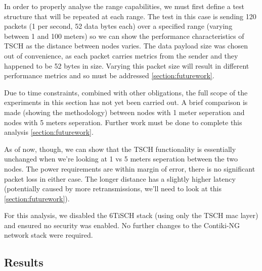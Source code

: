 \documentclass[conference]{IEEEtran}
\begin{document}
In order to properly analyse the range capabilities, we must first define a test structure that will be repeated at each range. The test in this case is sending 120 packets (1 per second, 52 data bytes each) over a specified range (varying between 1 and 100 meters) so we can show the performance characteristics of TSCH as the distance between nodes varies. The data payload size was chosen out of convenience, as each packet carries metrics from the sender and they happened to be 52 bytes in size. Varying this packet size will result in different performance metrics and so must be addressed \ref{section:futurework}. 

Due to time constraints, combined with other obligations, the full scope of the experiments in this section has not yet been carried out. A brief comparison is made (showing the methodology) between nodes with 1 meter seperation and nodes with 5 meters seperation. Further work must be done to complete this analysis \ref{section:futurework}.

As of now, though, we can show that the TSCH functionality is essentially unchanged when we're looking at 1 vs 5 meters seperation between the two nodes. The power requirements are within margin of error, there is no significant packet loss in either case. The longer distance has a slightly higher latency (potentially caused by more retransmissions, we'll need to look at this \ref{section:futurework}).

For this analysis, we disabled the 6TiSCH stack (using only the TSCH mac layer) and ensured no security was enabled. No further changes to the Contiki-NG network stack were required. 

\subsection{Results}
\end{document}
